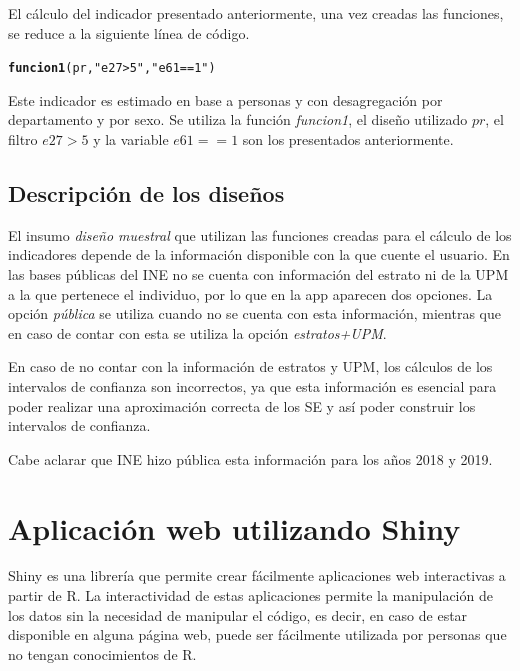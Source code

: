 \documentclass[12pt,twoside,spanish,a4paper]{book}\usepackage[]{graphicx}\usepackage[]{color}
\makeatletter
\newcommand{\hlstr}[1]{\textcolor[rgb]{0.192,0.494,0.8}{#1}}%
\newcommand{\hlstd}[1]{\textcolor[rgb]{0.345,0.345,0.345}{#1}}%
\newcommand{\hlkwd}[1]{\textcolor[rgb]{0.737,0.353,0.396}{\textbf{#1}}}%
\newenvironment{kframe}{%
 \def\at@end@of@kframe{}%
 \ifinner\ifhmode%
  \def\at@end@of@kframe{\end{minipage}}%
  \begin{minipage}{\columnwidth}%
 \fi\fi%
 \def\FrameCommand##1{\hskip\@totalleftmargin \hskip-\fboxsep
 \colorbox{shadecolor}{##1}\hskip-\fboxsep
     \hskip-\linewidth \hskip-\@totalleftmargin \hskip\columnwidth}%
 \MakeFramed {\advance\hsize-\width
   \@totalleftmargin\z@ \linewidth\hsize
   \@setminipage}}%
 {\par\unskip\endMakeFramed%
 \at@end@of@kframe}
\newenvironment{knitrout}{}{} %
\makeatother
\begin{document}
El cálculo del indicador presentado anteriormente, una vez creadas las funciones, se reduce a la siguiente línea de código.

\begin{knitrout}
\color{fgcolor}\begin{kframe}
\begin{alltt}
\hlkwd{funcion1}\hlstd{(pr,}\hlstr{"e27>5"}\hlstd{,}\hlstr{"e61==1"}\hlstd{)}
\end{alltt}
\end{kframe}
\end{knitrout}

Este indicador es estimado en base a personas y con desagregación por departamento y por sexo. Se utiliza la función \textit{funcion1}, el diseño utilizado $pr$, el filtro $e27>5$ y la variable $e61==1$ son los presentados anteriormente.

\subsection{Descripción de los diseños \label{subsec:dis}}

El insumo \textit{diseño muestral} que utilizan las funciones creadas para el cálculo de los indicadores depende de la información disponible con la que cuente el usuario. En las bases públicas del INE no se cuenta con información del estrato ni de la UPM a la que pertenece el individuo, por lo que en la app aparecen dos opciones. La opción \textit{pública} se utiliza cuando no se cuenta con esta información, mientras que en caso de contar con esta se utiliza la opción \textit{estratos+UPM}.

En caso de no contar con la información de estratos y UPM, los cálculos de los intervalos de confianza son incorrectos, ya que esta información es esencial para poder realizar una aproximación correcta de los SE y así poder construir los intervalos de confianza.

Cabe aclarar que INE hizo pública esta información para los años 2018 y 2019.

\section{Aplicación web utilizando Shiny \label{sec:shiny}}

Shiny \citep{shiny} es una librería que permite crear fácilmente aplicaciones web interactivas a partir de R. La interactividad de estas aplicaciones permite la manipulación de los datos sin la necesidad de manipular el código, es decir, en caso de estar disponible en alguna página web, puede ser fácilmente utilizada por personas que no tengan conocimientos de R.
\end{document}
